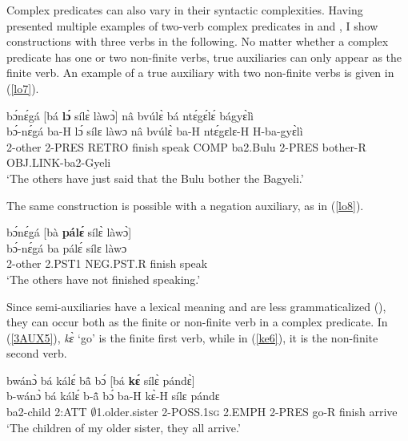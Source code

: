 Complex predicates can also vary in their syntactic complexities.
 Having presented multiple examples of two-verb complex predicates in  and , I show constructions with three verbs  in the following.
No matter whether a complex predicate has one or two non-finite verbs, true auxiliaries can only appear as the finite verb. 
An example of a true auxiliary with two non-finite verbs is given in (\ref{lo7}).

\begin{exe} 
\ex\label{lo7}
  \glll bɔ́nɛ́gá [bá {\bfseries lɔ́} sílɛ̀ làwɔ̀] nâ bvúlɛ̀ bá ntɛ́gɛ́lɛ́ bágyɛ̀lì \\
      bɔ́-nɛ́gá ba-H lɔ́ sílɛ làwɔ nâ bvúlɛ̀ ba-H ntɛ́gɛlɛ-H H-ba-gyɛ̀lì \\
        2-other 2-PRES RETRO  finish speak COMP ba2.Bulu 2-PRES bother-R OBJ.LINK-ba2-Gyeli\\
    \trans `The others have just said that the Bulu bother the Bagyeli.'
\end{exe}

\noindent The same construction is possible with a negation auxiliary, as in (\ref{lo8}).

\begin{exe} 
\ex\label{lo8}
  \glll bɔ́nɛ́gá [bà {\bfseries pálɛ́} sílɛ̀ làwɔ̀] \\
      bɔ́-nɛ́gá ba pálɛ́ sílɛ làwɔ \\
        2-other 2.PST1 NEG.PST.R  finish speak\\
    \trans `The others have not finished speaking.'
\end{exe}

Since semi-auxiliaries have a lexical meaning and are less grammaticalized (), they can occur both as the finite or non-finite verb in a complex predicate. In (\ref{3AUX5}), {\itshape kɛ̀} `go' is the finite first verb, while in (\ref{ke6}), it is the non-finite second verb.

\begin{exe} 
\ex\label{3AUX5}
  \glll  bwánɔ̀ bá kálɛ́ bã̂ bɔ́ [bá {\bfseries kɛ́} sílɛ̀ pándɛ̀] \\
          b-wánɔ̀ bá kálɛ́ b-ã̂ bɔ́ ba-H kɛ̀-H sílɛ pándɛ \\
         ba2-child 2:ATT $\emptyset$1.older.sister 2-POSS.1\textsc{sg} 2.EMPH 2-PRES go-R finish arrive  \\
    \trans `The children of my older sister, they all arrive.'
\end{exe}

